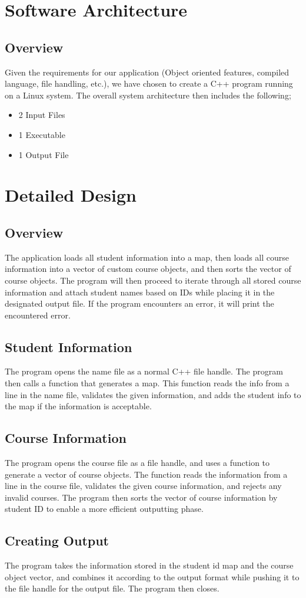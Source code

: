 \documentclass{article}
\begin{document}
\section{Software Architecture}
\subsection{Overview}
Given the requirements for our application (Object oriented features, compiled language, file handling, etc.), we have chosen to create a C++ program running on a Linux system.
The overall system architecture then includes the following; 
\begin{itemize}
\item 2 Input Files
\item 1 Executable
\item 1 Output File
\end{itemize}

\section{Detailed Design}
\subsection{Overview}
The application loads all student information into a map, then loads all course information into a vector of custom course objects, and then sorts the vector of course objects. The program will then proceed to iterate through all stored course information and attach student names based on IDs while placing it in the designated output file. If the program encounters an error, it will print the encountered error.

\subsection{Student Information}
The program opens the name file as a normal C++ file handle. The program then calls a function that generates a map. This function reads the info from a line in the name file, validates the given information, and adds the student info to the map if the information is acceptable. 

\subsection{Course Information}
The program opens the course file as a file handle, and uses a function to generate a vector of course objects. The function reads the information from a line in the course file, validates the given course information, and rejects any invalid courses. The program then sorts the vector of course information by student ID to enable a more efficient outputting phase.

\subsection{Creating Output}
The program takes the information stored in the student id map and the course object vector, and combines it according to the output format while pushing it to the file handle for the output file. The program then closes.
\end{document}
